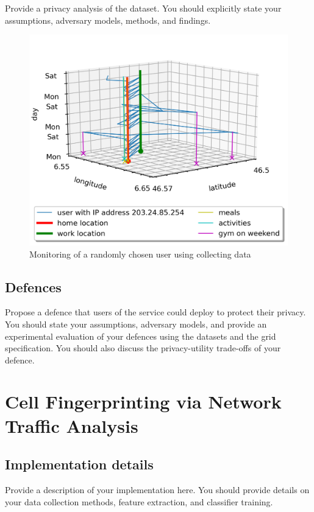 \documentclass[10pt,conference,compsocconf]{IEEEtran}
\begin{document}
Provide a privacy analysis of the dataset. You should explicitly state your assumptions, adversary
models, methods, and findings.

\begin{figure}
  \includegraphics[width=\columnwidth]{random.png}
  \caption{Monitoring of a randomly chosen user using collecting data}
  \label{random_fig}
\end{figure}

\subsection{Defences}
Propose a defence that users of the service could deploy to protect their privacy.  You
should state your assumptions, adversary models, and provide an experimental evaluation of your
defences using the datasets and the grid specification. You should also discuss the
privacy-utility trade-offs of your defence.

\section{Cell Fingerprinting via Network Traffic Analysis}

\subsection{Implementation details}
Provide a description of your implementation here. You should provide details on your data collection methods, feature extraction, and classifier training.
\end{document}

